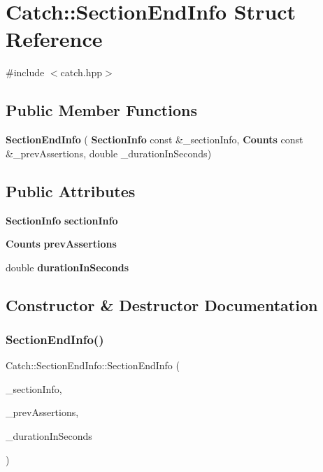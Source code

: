\section{Catch\+:\+:Section\+End\+Info Struct Reference}
\label{struct_catch_1_1_section_end_info}


{\ttfamily \#include $<$catch.\+hpp$>$}

\subsection*{Public Member Functions}
\begin{DoxyCompactItemize}
\item 
\textbf{ Section\+End\+Info} (\textbf{ Section\+Info} const \&\+\_\+section\+Info, \textbf{ Counts} const \&\+\_\+prev\+Assertions, double \+\_\+duration\+In\+Seconds)
\end{DoxyCompactItemize}
\subsection*{Public Attributes}
\begin{DoxyCompactItemize}
\item 
\textbf{ Section\+Info} \textbf{ section\+Info}
\item 
\textbf{ Counts} \textbf{ prev\+Assertions}
\item 
double \textbf{ duration\+In\+Seconds}
\end{DoxyCompactItemize}


\subsection{Constructor \& Destructor Documentation}
\mbox{\label{struct_catch_1_1_section_end_info_abc9381c7c22b6907317ec985ccaa6713}} 
\subsubsection{Section\+End\+Info()}
{\footnotesize\ttfamily Catch\+::\+Section\+End\+Info\+::\+Section\+End\+Info (\begin{DoxyParamCaption}\item[{\textbf{ Section\+Info} const \&}]{\+\_\+section\+Info,  }\item[{\textbf{ Counts} const \&}]{\+\_\+prev\+Assertions,  }\item[{double}]{\+\_\+duration\+In\+Seconds }\end{DoxyParamCaption})\hspace{0.3cm}{\ttfamily [inline]}}



